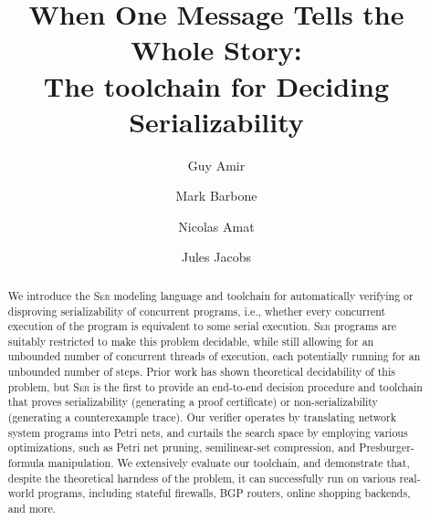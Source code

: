 \documentclass[a4paper]{llncs}
\title{When One Message Tells the Whole Story:\\ The \toolname{} toolchain for Deciding Serializability}
\author{
			Guy Amir \and
			Mark Barbone \and
			Nicolas Amat \and
			Jules Jacobs
		}
\institute{}
\newcommand{\toolname}{\textsc{Ser}}
\let\oldmaketitle\maketitle
\renewcommand{\maketitle}{
  \oldmaketitle
  \pagestyle{plain}  %
  \thispagestyle{plain}  %
}
\begin{document}
\raggedbottom


%	

\maketitle

\begin{abstract}
	We introduce the \toolname{} modeling language and toolchain for automatically verifying or disproving serializability of concurrent programs, i.e., whether every concurrent execution of the program is equivalent to some serial execution.
	\toolname{} programs are suitably restricted to make this problem decidable, while still allowing for an unbounded number of concurrent threads of execution, each potentially running for an unbounded number of steps.
	Prior work has shown theoretical decidability of this problem, but \toolname{} is the first to provide an end-to-end decision procedure and toolchain that proves serializability (generating a proof certificate) or non-serializability (generating a counterexample trace).
	Our verifier operates by translating network system programs into Petri nets, and curtails the search space by employing various optimizations, such as Petri net pruning, semilinear-set compression, and Presburger-formula manipulation.
	We extensively evaluate our toolchain, and demonstrate that, despite the theoretical harndess of the problem, it can successfully run on various real-world programs, including stateful firewalls, BGP routers, online shopping backends, and more.
\end{abstract}











\newpage

{
	
	
}

\newpage












\end{document}
